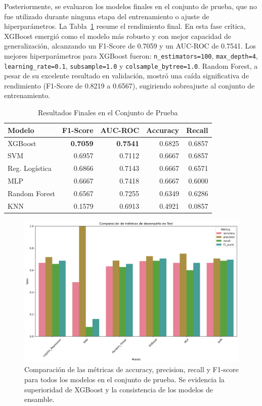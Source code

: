 \documentclass[journal]{IEEEtai}
\begin{document}
Posteriormente, se evaluaron los modelos finales en el conjunto de prueba, que no fue utilizado durante ninguna etapa del entrenamiento o ajuste de hiperparámetros. La Tabla~\ref{tab:test_results} resume el rendimiento final. En esta fase crítica, XGBoost emergió como el modelo más robusto y con mejor capacidad de generalización, alcanzando un F1-Score de 0.7059 y un AUC-ROC de 0.7541. Los mejores hiperparámetros para XGBoost fueron: \texttt{n\_estimators=100}, \texttt{max\_depth=4}, \texttt{learning\_rate=0.1}, \texttt{subsample=1.0} y \texttt{colsample\_bytree=1.0}. Random Forest, a pesar de su excelente resultado en validación, mostró una caída significativa de rendimiento (F1-Score de 0.8219 a 0.6567), sugiriendo sobreajuste al conjunto de entrenamiento.

\begin{table}[!ht]
\centering
\caption{Resultados Finales en el Conjunto de Prueba}
\label{tab:test_results}
\begin{tabular}{lrrrr}
\toprule
\textbf{Modelo} & \textbf{F1-Score} & \textbf{AUC-ROC} & \textbf{Accuracy} & \textbf{Recall} \\
\midrule
XGBoost & \textbf{0.7059} & \textbf{0.7541} & 0.6825 & 0.6857 \\
SVM & 0.6957 & 0.7112 & 0.6667 & 0.6857 \\
Reg. Logística & 0.6866 & 0.7143 & 0.6667 & 0.6571 \\
MLP & 0.6667 & 0.7418 & 0.6667 & 0.6000 \\
Random Forest & 0.6567 & 0.7255 & 0.6349 & 0.6286 \\
KNN & 0.1579 & 0.6913 & 0.4921 & 0.0857 \\
\bottomrule
\end{tabular}
\end{table}

\begin{figure}[!t]
\centering
\includegraphics[width=\columnwidth]{graficas/comparacion_metricas_test.png}
\caption{Comparación de las métricas de accuracy, precision, recall y F1-score para todos los modelos en el conjunto de prueba. Se evidencia la superioridad de XGBoost y la consistencia de los modelos de ensamble.}
\label{fig:metricas_test}
\end{figure}
\end{document}
